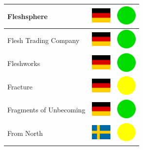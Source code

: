 \documentclass[12pt, a4paper, twoside]{report}
\begin{document}
\begin{center}
\begin{longtable}{|p{5cm}|p{2cm}|p{2cm}|}
 Fleshsphere                                                & \includegraphics[width=1cm]{../img/flags/de} &   \includegraphics[width=1cm]{../likes/y} \\ \hline
 Flesh Trading Company                                      & \includegraphics[width=1cm]{../img/flags/de} &   \includegraphics[width=1cm]{../likes/y} \\ \hline
 Fleshworks                                                 & \includegraphics[width=1cm]{../img/flags/de} &   \includegraphics[width=1cm]{../likes/y} \\ \hline
 Fracture                                                   & \includegraphics[width=1cm]{../img/flags/de} &   \includegraphics[width=1cm]{../likes/m} \\ \hline
 Fragments of Unbecoming                                    & \includegraphics[width=1cm]{../img/flags/de} &   \includegraphics[width=1cm]{../likes/y} \\ \hline
 From North                                                 & \includegraphics[width=1cm]{../img/flags/se} &   \includegraphics[width=1cm]{../likes/m} \\ \hline

\end{longtable}
\end{center}
\end{document}
